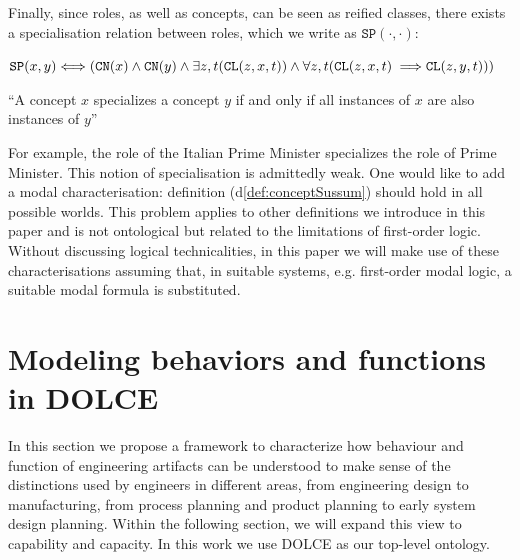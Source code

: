 \documentclass[sw]{iosart2x}
\newcommand{\bflist}{\begin{list}{}{\setlength{\topsep}{2mm}\setlength{\partopsep}{0mm}\setlength{\parsep}{0mm}\setlength{\leftmargin}{9mm}\setlength{\labelwidth}{8mm}}}
\newcommand{\eflist}{\end{list}}
\newcommand{\DefLabel}{\textrm{d}}
\newcounter{cntdef}
\newcommand{\mydf}[1]{\refstepcounter{cntdef}\begin{small}{\bf \DefLabel\thecntdef\label{def:#1}}\end{small}}
\newcommand{\mytext}[1]{``#1''}
\newcommand{\refdf}[1]{({\DefLabel}\ref{#1})}
\newcommand{\generalStyle}[1]{\texttt{#1}}
\newcommand{\biRel}[3]{\generalStyle{#1}(#2,#3)}
\newcommand{\uniRel}[2]{\generalStyle{#1}(#2)}
\newcommand{\triRel}[4]{\generalStyle{#1}(#2,#3,#4)}
\newcommand{\myiff}{\Longleftrightarrow}
\newcommand{\myfi}{\hspace{0.9mm} \Longrightarrow}
\newcommand{\DOLCE}{\textsc{DOLCE}\xspace} %
\newcommand{\DOLCEConcept}[1]{\uniRel{{CN}}{#1}}
\newcommand{\DOLCECLby}[3]{\triRel{CL}{#1}{#2}{#3}}
\newcommand{\DOLCEConceptSubsum}[2]{\biRel{SP}{#1}{#2}}
\newcommand{\TODOinline}[1]{{%
}}
\begin{document}
Finally, since roles, as well as concepts, can be seen as reified classes, there exists a specialisation relation between roles, which we write as $\DOLCEConceptSubsum{\cdot}{\cdot}$:
\bflist
\item[\mydf{conceptSussum}] $ \DOLCEConceptSubsum{x}{y} \myiff (\DOLCEConcept{x} \land \DOLCEConcept{y} \land \exists z,t (\DOLCECLby{z}{x}{t}) \land \forall z,t (\DOLCECLby{z}{x}{t} \myfi \DOLCECLby{z}{y}{t}) )$%
\item \mytext{A concept $x$ specializes a concept $y$ if and only if all instances of $x$ are also instances of $y$} %
\eflist
For example, the role of the Italian Prime Minister specializes the role of Prime Minister.
{This notion of specialisation is admittedly weak. One would like to add a modal characterisation: definition \refdf{def:conceptSussum} should hold in all possible worlds. This problem applies to other definitions we introduce in this paper %
and is not ontological but related to the limitations of first-order logic. Without discussing logical technicalities, in this paper we will make use of these characterisations assuming that, in suitable systems, e.g. first-order modal logic, a suitable modal formula is substituted.}\TODOinline{[SB: ho aggiunto, check e conferma][FC: ero convinto di avere letto d6 da qualche parte, ma ho controllato ed apparentemente è un ricordo falso, quindi la tua aggiunta è doverosa. Ho tolto però la frase "in some special cases we will discuss this issue" perché mi preoccupa aggiungere interconnessioni tra le parti del testo]}

\section{Modeling behaviors and functions in \DOLCE \label{sec:capabilitiesEtc}}
In this section we propose a framework to characterize how behaviour and function of engineering artifacts can be understood to make sense of the distinctions used by engineers in different areas, from engineering design to manufacturing, from process planning and product planning to early system design planning. Within the following section, we will expand this view to capability and capacity.
In this work we use \DOLCE as our top-level ontology.
\end{document}

